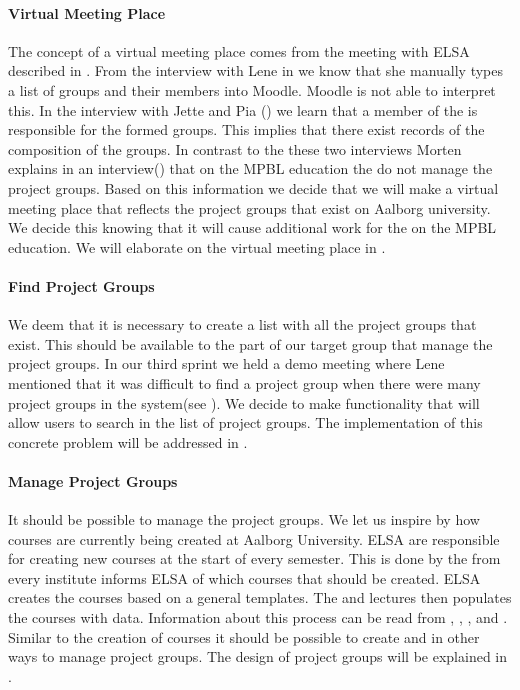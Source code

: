 \paragraph{Virtual Meeting Place}
The concept of a virtual meeting place comes from the meeting with ELSA described in . 
From the interview with Lene in  we know that she manually types a list of groups and their members into Moodle.
Moodle is not able to interpret this.
In the interview with Jette and Pia () we learn that a member of the \admpers{} is responsible for the formed groups. 
This implies that there exist records of the composition of the groups.   
In contrast to the these two interviews Morten explains in an interview() that on the MPBL education the \admpers{} do not manage the project groups.
Based on this information we decide that we will make a virtual meeting place that reflects the project groups that exist on Aalborg university. 
We decide this knowing that it will cause additional work for the \admpers{} on the MPBL education. 
We will elaborate on the virtual meeting place in .

\paragraph{Find Project Groups}
We deem that it is necessary to create a list with all the project groups that exist.
This should be available to the part of our target group that manage the project groups.
In our third sprint we held a demo meeting where Lene mentioned that it was difficult to find a project group when there were many project groups in the system(see ).
We decide to make functionality that will allow users to search in the list of project groups.
The implementation of this concrete problem will be addressed in .

\paragraph{Manage Project Groups}
It should be possible to manage the project groups. 
We let us inspire by how courses are currently being created at Aalborg University.
ELSA are responsible for creating new courses at the start of every semester. 
This is done by the \admpers{} from every institute informs ELSA of which courses that should be created. 
ELSA creates the courses based on a general templates.
The \admpers{} and lectures then populates the courses with data. 
Information about this process can be read from , ,  , and .
Similar to the creation of courses it should be possible to create and in other ways to manage project groups. 
The design of project groups will be explained in . \\

